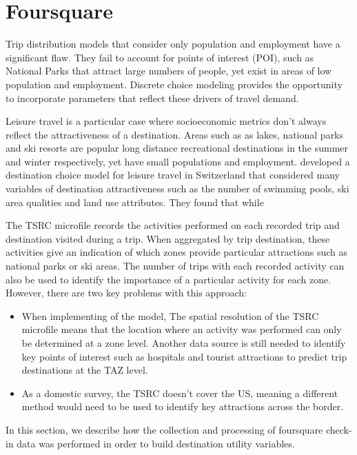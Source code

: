 \section{Foursquare}
\label{section:data-foursquare}
Trip distribution models that consider only population and employment have a significant flaw. They fail to account for points of interest (POI), such as National Parks that attract large numbers of people, yet exist in areas of low population and employment. Discrete choice modeling provides the opportunity to incorporate parameters that reflect these drivers of travel demand. 
	
Leisure travel is a particular case where socioeconomic metrics don't always reflect the attractiveness of a destination. Areas such as as lakes, national parks and ski resorts are popular long distance recreational destinations in the summer and winter respectively, yet have small populations and employment. 
\textcite{simma2001destination} developed a destination choice model for leisure travel in Switzerland that considered many variables of destination attractiveness such as the number of swimming pools, ski area qualities and land use attributes. They found that while
	
The TSRC microfile records the activities performed on each recorded trip and destination visited during a trip. When aggregated by trip destination, these activities give an indication of which zones provide particular attractions such as national parks or ski areas. The number of trips with each recorded activity can also be used to identify the importance of a particular activity for each zone. However, there are two key problems with this approach:

\begin{itemize}
\item When implementing of the model,  The spatial resolution of the TSRC microfile means that the location where an activity was performed can only be determined at a zone level. Another data source is still needed to identify key points of interest such as hospitals and tourist attractions to predict trip destinations at the TAZ level.
\item As a domestic survey, the TSRC doesn't cover the US, meaning a different method would need to be used to identify key attractions across the border.
\end{itemize}	
In this section, we describe how the collection and processing of foursquare check-in data was performed in order to build destination utility variables.

